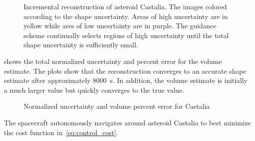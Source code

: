 \documentclass[smallextended]{svjour3}       %
\begin{document}
\begin{figure}[htbp]
    \centering

    \caption[Asteroid Castalia shape reconstruction with uncertainty]{Incremental reconstruction of asteroid Castalia. The images colored according to the shape uncertainty. Areas of high uncertainty are in yellow while ares of low uncertainty are in purple.
    The guidance scheme continually selects regions of high uncertainty until the total shape uncertainty is sufficiently small.
    ~\label{fig:castalia_weights_reconstruction}}
\end{figure}

 shows the total normalized uncertainty and percent error for the volume estimate. 
The plots show that the reconstruction converges to an accurate shape estimate after approximately \SI{8000}{\second}.
In addition, the volume estimate is initially a much larger value but quickly converges to the true value.
\begin{figure}[htbp]
    \centering
    
    \caption{Normalized uncertainty and volume percent error for Castalia\label{fig:castalia_metrics}}
\end{figure}
The spacecraft autonomously navigates around asteroid Castalia to best minimize the cost function in~\cref{eq:control_cost}.
\end{document}
